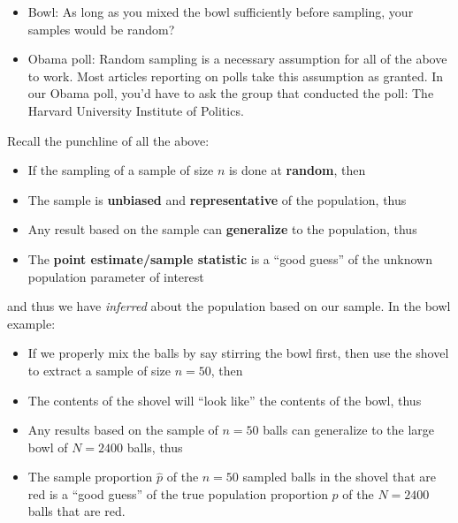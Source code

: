 \documentclass[12pt,]{krantz}
\providecommand{\tightlist}{%
  \setlength{\itemsep}{0pt}\setlength{\parskip}{0pt}}
\renewenvironment{quote}{\begin{VF}}{\end{VF}}
\theoremstyle{definition}
\theoremstyle{definition}
\theoremstyle{definition}
\theoremstyle{remark}
\begin{document}
\begin{enumerate}
  \begin{itemize}
  \tightlist
  \item
    Bowl: As long as you mixed the bowl sufficiently before sampling,
    your samples would be random?
  \item
    Obama poll: Random sampling is a necessary assumption for all of the
    above to work. Most articles reporting on polls take this assumption
    as granted. In our Obama poll, you'd have to ask the group that
    conducted the poll: The Harvard University Institute of Politics.
  \end{itemize}
\end{enumerate}

Recall the punchline of all the above:

\begin{quote}
\begin{itemize}
\tightlist
\item
  If the sampling of a sample of size \(n\) is done at \textbf{random},
  then
\item
  The sample is \textbf{unbiased} and \textbf{representative} of the
  population, thus
\item
  Any result based on the sample can \textbf{generalize} to the
  population, thus
\item
  The \textbf{point estimate/sample statistic} is a ``good guess'' of
  the unknown population parameter of interest
\end{itemize}
\end{quote}

and thus we have \emph{inferred} about the population based on our
sample. In the bowl example:

\begin{quote}
\begin{itemize}
\tightlist
\item
  If we properly mix the balls by say stirring the bowl first, then use
  the shovel to extract a sample of size \(n=50\), then
\item
  The contents of the shovel will ``look like'' the contents of the
  bowl, thus
\item
  Any results based on the sample of \(n=50\) balls can generalize to
  the large bowl of \(N=2400\) balls, thus
\item
  The sample proportion \(\widehat{p}\) of the \(n=50\) sampled balls in
  the shovel that are red is a ``good guess'' of the true population
  proportion \(p\) of the \(N=2400\) balls that are red.
\end{itemize}
\end{quote}
\end{document}
